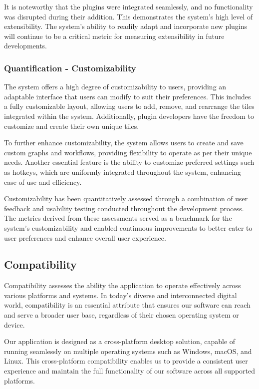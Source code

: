 \documentclass[11pt,a4paper]{article}
\begin{document}
It is noteworthy that the plugins were integrated seamlessly, and no
functionality was disrupted during their addition. This demonstrates the
system's high level of extensibility. The system's ability to readily adapt and
incorporate new plugins will continue to be a critical metric for measuring
extensibility in future developments.

\subsubsection*{Quantification - Customizability}

The system offers a high degree of customizability to users, providing an
adaptable interface that users can modify to suit their preferences. This
includes a fully customizable layout, allowing users to add, remove, and
rearrange the tiles integrated within the system. Additionally, plugin
developers have the freedom to customize and create their own unique tiles.

To further enhance customizability, the system allows users to create and save
custom graphs and workflows, providing flexibility to operate as per their
unique needs. Another essential feature is the ability to customize preferred
settings such as hotkeys, which are uniformly integrated throughout the system,
enhancing ease of use and efficiency.

Customizability has been quantitatively assessed through a combination of user
feedback and usability testing conducted throughout the development process. The
metrics derived from these assessments served as a benchmark for the system's
customizability and enabled continuous improvements to better cater to user
preferences and enhance overall user experience.

\subsection*{Compatibility}

Compatibility assesses the ability the application to operate effectively across
various platforms and systems. In today's diverse and interconnected digital
world, compatibility is an essential attribute that ensures our software can
reach and serve a broader user base, regardless of their chosen operating system
or device.

Our application is designed as a cross-platform desktop solution, capable of
running seamlessly on multiple operating systems such as Windows, macOS, and
Linux. This cross-platform compatibility enables us to provide a consistent user
experience and maintain the full functionality of our software across all
supported platforms.
\end{document}
